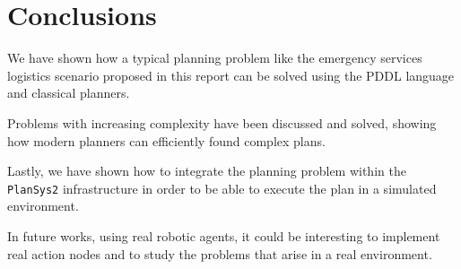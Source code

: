 \section{Conclusions}
\label{sec5}

We have shown how a typical planning problem like the emergency services logistics scenario 
proposed in this report can be solved using the PDDL language and classical planners.

Problems with increasing complexity have been discussed and solved, showing how modern planners can 
efficiently found complex plans.

Lastly, we have shown how to integrate the planning problem within the \texttt{PlanSys2} infrastructure
in order to be able to execute the plan in a simulated environment.

In future works, using real robotic agents, it could be interesting to implement real action nodes
and to study the problems that arise in a real environment.

